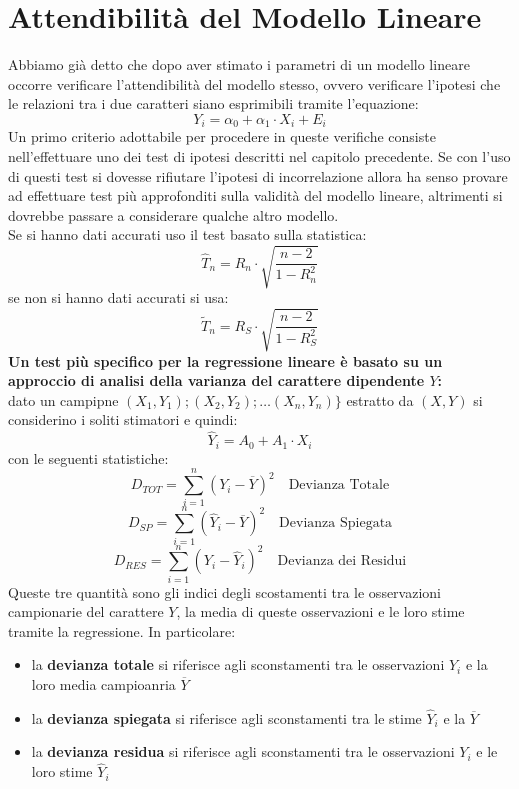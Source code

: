 \documentclass[a4paper,12pt, oneside]{book}
\begin{document}
\section{Attendibilità del Modello Lineare}
Abbiamo già detto che dopo aver stimato i parametri di un modello lineare occorre
verificare l’attendibilità del modello stesso, ovvero verificare l’ipotesi che le relazioni
tra i due caratteri siano esprimibili tramite l’equazione:
\[Y_{i}=\alpha_{0}+\alpha_{1} \cdot X_{i}+E_{i}\]
Un primo criterio adottabile per procedere in queste verifiche consiste
nell’effettuare uno dei test di ipotesi descritti nel capitolo precedente. Se con l’uso di questi test si dovesse rifiutare l’ipotesi di incorrelazione allora ha
senso provare ad effettuare test più approfonditi sulla validità del modello lineare,
altrimenti si dovrebbe passare a considerare qualche altro modello.\\
Se si hanno dati accurati uso il test basato sulla statistica:
\[\hat{T}_{n}=R_{n} \cdot \sqrt{\frac{n-2}{1-R_{n}^{2}}}\]
se non si hanno dati accurati si usa:
\[\tilde{T}_{n}=R_{S} \cdot \sqrt{\frac{n-2}{1-R_{S}^{2}}}\]
\textbf{Un test più specifico per la regressione lineare è basato su un approccio di analisi della varianza
  del carattere dipendente $Y$:}\\
dato un campipne $\left(X_{1}, Y_{1}\right) ;\left(X_{2}, Y_{2}\right) ; \ldots\left(X_{n}, Y_{n}\right) \}$ estratto da $(X,Y)$
si considerino i soliti stimatori e quindi:
\[\hat{Y}_{i}=A_{0}+A_{1} \cdot X_{i}\]
con le seguenti statistiche:
\[D_{T O T}=\sum_{i=1}^{n}\left(Y_{i}-\overline{Y}\right)^{2} \quad \text{Devianza Totale}\]
\[D_{S P}=\sum_{i=1}^{n}\left(\hat{Y}_{i}-\overline{Y}\right)^{2} \quad \text{Devianza Spiegata}\]
\[D_{R E S}=\sum_{i=1}^{n}\left(Y_{i}-\hat{Y}_{i}\right)^{2} \quad \text{Devianza dei Residui}\]
Queste tre quantità sono gli indici degli scostamenti tra le osservazioni campionarie
del carattere $Y$, la media di queste osservazioni e le loro stime tramite la regressione. In particolare:
\begin{itemize}
\item la \textbf{devianza totale} si riferisce agli sconstamenti tra le osservazioni $Y_i$ e la loro media campioanria $\overline{Y}$
\item la \textbf{devianza spiegata} si riferisce agli sconstamenti tra le stime $\hat{Y}_i$ e la $\overline{Y}$
\item la \textbf{devianza residua} si riferisce agli sconstamenti tra le osservazioni $Y_i$ e le loro stime $\hat{Y}_i$
\end{itemize}
\end{document}
